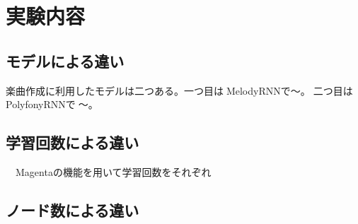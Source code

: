\chapter{実験内容}
\section{モデルによる違い}
楽曲作成に利用したモデルは二つある。一つ目はMelodyRNNで〜。二つ目はPolyfonyRNNで〜。
\section{学習回数による違い}

　Magentaの機能を用いて学習回数をそれぞれ
\section{ノード数による違い}

